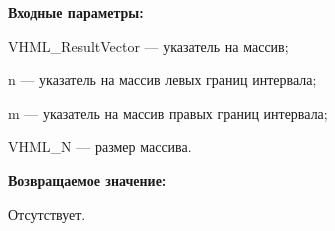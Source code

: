 \textbf{Входные параметры:}
 
VHML\_ResultVector --- указатель на массив;
 
n --- указатель на массив левых границ интервала;
 
m --- указатель на массив правых границ интервала;
 
VHML\_N --- размер массива.

\textbf{Возвращаемое значение:}

Отсутствует.